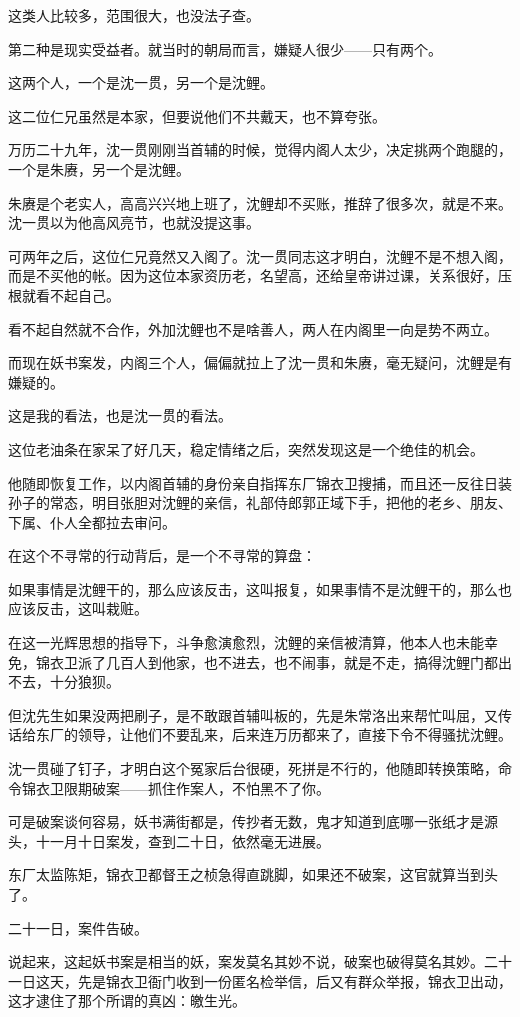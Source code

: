 \begin{multicols}{\theparacolNo}
这类人比较多，范围很大，也没法子查。

第二种是现实受益者。就当时的朝局而言，嫌疑人很少——只有两个。

这两个人，一个是沈一贯，另一个是沈鲤。

这二位仁兄虽然是本家，但要说他们不共戴天，也不算夸张。

万历二十九年，沈一贯刚刚当首辅的时候，觉得内阁人太少，决定挑两个跑腿的，一个是朱赓，另一个是沈鲤。

朱赓是个老实人，高高兴兴地上班了，沈鲤却不买账，推辞了很多次，就是不来。沈一贯以为他高风亮节，也就没提这事。

可两年之后，这位仁兄竟然又入阁了。沈一贯同志这才明白，沈鲤不是不想入阁，而是不买他的帐。因为这位本家资历老，名望高，还给皇帝讲过课，关系很好，压根就看不起自己。

看不起自然就不合作，外加沈鲤也不是啥善人，两人在内阁里一向是势不两立。

而现在妖书案发，内阁三个人，偏偏就拉上了沈一贯和朱赓，毫无疑问，沈鲤是有嫌疑的。

这是我的看法，也是沈一贯的看法。

这位老油条在家呆了好几天，稳定情绪之后，突然发现这是一个绝佳的机会。

他随即恢复工作，以内阁首辅的身份亲自指挥东厂锦衣卫搜捕，而且还一反往日装孙子的常态，明目张胆对沈鲤的亲信，礼部侍郎郭正域下手，把他的老乡、朋友、下属、仆人全都拉去审问。

在这个不寻常的行动背后，是一个不寻常的算盘：

如果事情是沈鲤干的，那么应该反击，这叫报复，如果事情不是沈鲤干的，那么也应该反击，这叫栽赃。

在这一光辉思想的指导下，斗争愈演愈烈，沈鲤的亲信被清算，他本人也未能幸免，锦衣卫派了几百人到他家，也不进去，也不闹事，就是不走，搞得沈鲤门都出不去，十分狼狈。

但沈先生如果没两把刷子，是不敢跟首辅叫板的，先是朱常洛出来帮忙叫屈，又传话给东厂的领导，让他们不要乱来，后来连万历都来了，直接下令不得骚扰沈鲤。

沈一贯碰了钉子，才明白这个冤家后台很硬，死拼是不行的，他随即转换策略，命令锦衣卫限期破案——抓住作案人，不怕黑不了你。

可是破案谈何容易，妖书满街都是，传抄者无数，鬼才知道到底哪一张纸才是源头，十一月十日案发，查到二十日，依然毫无进展。

东厂太监陈矩，锦衣卫都督王之桢急得直跳脚，如果还不破案，这官就算当到头了。

二十一日，案件告破。

说起来，这起妖书案是相当的妖，案发莫名其妙不说，破案也破得莫名其妙。二十一日这天，先是锦衣卫衙门收到一份匿名检举信，后又有群众举报，锦衣卫出动，这才逮住了那个所谓的真凶：皦生光。


\end{multicols}
